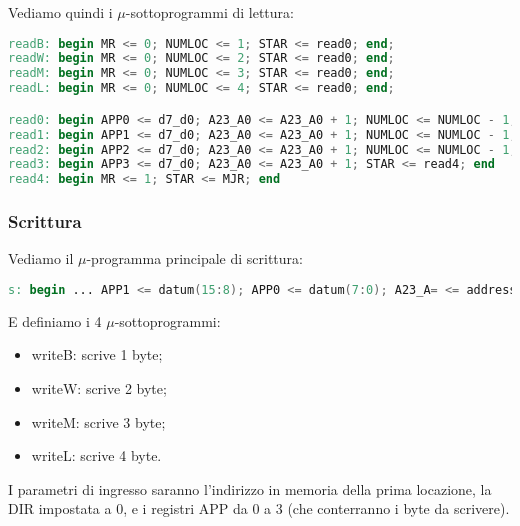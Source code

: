 \documentclass[a4paper,11pt]{article}
\begin{document}
Vediamo quindi i $\mu$-sottoprogrammi di lettura:
\begin{lstlisting}[language=verilog, style=codestyle]	
readB: begin MR <= 0; NUMLOC <= 1; STAR <= read0; end;
readW: begin MR <= 0; NUMLOC <= 2; STAR <= read0; end;
readM: begin MR <= 0; NUMLOC <= 3; STAR <= read0; end;
readL: begin MR <= 0; NUMLOC <= 4; STAR <= read0; end;

read0: begin APP0 <= d7_d0; A23_A0 <= A23_A0 + 1; NUMLOC <= NUMLOC - 1; STAR <= ( NUMLOC == 1 ) ? read4 : read1; end
read1: begin APP1 <= d7_d0; A23_A0 <= A23_A0 + 1; NUMLOC <= NUMLOC - 1; STAR <= ( NUMLOC == 1 ) ? read4 : read2; end
read2: begin APP2 <= d7_d0; A23_A0 <= A23_A0 + 1; NUMLOC <= NUMLOC - 1; STAR <= ( NUMLOC == 1 ) ? read4 : read3; end
read3: begin APP3 <= d7_d0; A23_A0 <= A23_A0 + 1; STAR <= read4; end
read4: begin MR <= 1; STAR <= MJR; end
\end{lstlisting}

\subsubsection{Scrittura}
Vediamo il $\mu$-programma principale di scrittura:
\begin{lstlisting}[language=verilog, style=codestyle]	
s: begin ... APP1 <= datum(15:8); APP0 <= datum(7:0); A23_A= <= address; MJR = s_x+1; STAR <= subprogram; end
\end{lstlisting}

E definiamo i 4 $\mu$-sottoprogrammi:
\begin{itemize}
	\item writeB: scrive 1 byte;
	\item writeW: scrive 2 byte;
	\item writeM: scrive 3 byte;
	\item writeL: scrive 4 byte.
\end{itemize}

I parametri di ingresso saranno l'indirizzo in memoria della prima locazione, la DIR impostata a 0, e i registri APP da 0 a 3 (che conterranno i byte da scrivere).
\end{document}
